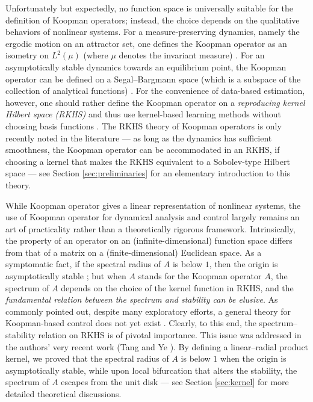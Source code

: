 \documentclass[english]{cccconf}
\renewcommand{\emph}[1]{\textit{#1}}
\begin{document}
\par Unfortunately but expectedly, no function space is universally suitable for the definition of Koopman operators; instead, the choice depends on the qualitative behaviors of nonlinear systems. 
For a measure-preserving dynamics, namely the ergodic motion on an attractor set, one defines the Koopman operator as an isometry on $L^2(\mu)$ (where $\mu$ denotes the invariant measure) \cite{korda2018convergence, colbrook2024rigorous}. For an asymptotically stable dynamics towards an equilibrium point, the Koopman operator can be defined on a Segal--Bargmann space (which is a subspace of the collection of analytical functions) \cite{mezic2020spectrum}. 
For the convenience of data-based estimation, however, one should rather define the Koopman operator on a \emph{reproducing kernel Hilbert space (RKHS)} \cite{paulsen2016introduction} and thus use kernel-based learning methods without choosing basis functions \cite{william2015kernel, kawahara2016dynamic}. 
The RKHS theory of Koopman operators is only recently noted in the literature --- as long as the dynamics has sufficient smoothness, the Koopman operator can be accommodated in an RKHS, if choosing a kernel that makes the RKHS equivalent to a Sobolev-type Hilbert space \cite{kohne2025Linf, tang2025koopman, tang2025data} --- see Section \ref{sec:preliminaries} for an elementary introduction to this theory. 

\par While Koopman operator gives a linear representation of nonlinear systems, the use of Koopman operator for dynamical analysis and control largely remains an art of practicality rather than a theoretically rigorous framework. Intrinsically, the property of an operator on an (infinite-dimensional) function space differs from that of a matrix on a (finite-dimensional) Euclidean space. 
As a symptomatic fact, if the spectral radius of $A$ is below $1$, then the origin is asymptotically stable \cite{antsaklis2006linear}; but when $A$ stands for the Koopman operator $A$, the spectrum of $A$ depends on the choice of the kernel function in RKHS, and the \emph{fundamental relation between the spectrum and stability can be elusive}. 
As commonly pointed out, despite many exploratory efforts, a general theory for Koopman-based control does not yet exist \cite{strasser2025overview, haseli2025roads}. Clearly, to this end, the spectrum--stability relation on RKHS is of pivotal importance. 
This issue was addressed in the authors' very recent work (Tang and Ye \cite{tang-ye-2025-l4dc}). By defining a linear--radial product kernel, we proved that the spectral radius of $A$ is below $1$ when the origin is asymptotically stable, while upon local bifurcation that alters the stability, the spectrum of $A$ escapes from the unit disk --- see Section \ref{sec:kernel} for more detailed theoretical discussions. 
\end{document}

